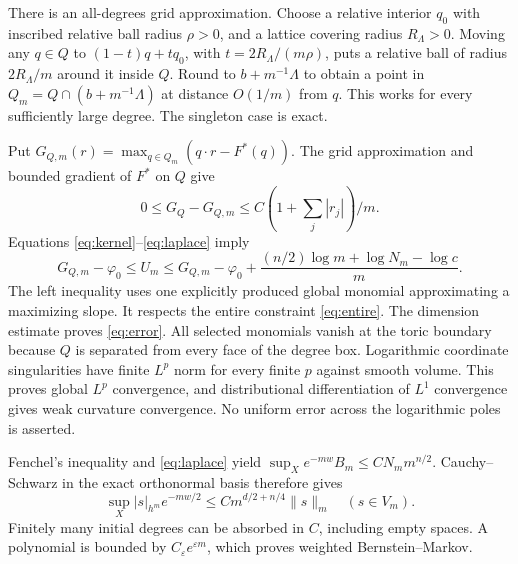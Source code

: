 \documentclass[11pt]{article}
\begin{document}
There is an all-degrees grid approximation. Choose a relative interior
$q_0$ with inscribed relative ball radius $\rho>0$, and a lattice
covering radius $R_\Lambda>0$. Moving any $q\in Q$ to
$(1-t)q+tq_0$, with $t=2R_\Lambda/(m\rho)$, puts a relative ball
of radius $2R_\Lambda/m$ around it inside $Q$. Round to
$b+m^{-1}\Lambda$ to obtain a point in
$Q_m=Q\cap(b+m^{-1}\Lambda)$ at distance $O(1/m)$ from $q$.
This works for every sufficiently large degree. The singleton case
is exact.

Put $G_{Q,m}(r)=\max_{q\in Q_m}(q\cdot r-F^*(q))$.
The grid approximation and bounded gradient of $F^*$ on $Q$ give
\[
 0\leq G_Q-G_{Q,m}\leq C(1+\textstyle\sum_j|r_j|)/m.
\]
Equations \eqref{eq:kernel}--\eqref{eq:laplace} imply
\begin{equation}\label{eq:sandwich}
 G_{Q,m}-\varphi_0\leq U_m\leq G_{Q,m}-\varphi_0+
               \frac{(n/2)\log m+\log N_m-\log c}{m}.
\end{equation}
The left inequality uses one explicitly produced global monomial
approximating a maximizing slope. It respects the entire constraint
\eqref{eq:entire}. The dimension estimate proves \eqref{eq:error}.
All selected monomials vanish at the toric boundary because $Q$ is
separated from every face of the degree box. Logarithmic coordinate
singularities have finite $L^p$ norm for every finite $p$ against
smooth volume. This proves global $L^p$ convergence, and distributional
differentiation of $L^1$ convergence gives weak curvature convergence.
No uniform error across the logarithmic poles is asserted.

Fenchel's inequality and \eqref{eq:laplace} yield
$\sup_X e^{-mw}B_m\leq C N_m m^{n/2}$. Cauchy--Schwarz in the exact
orthonormal basis therefore gives
\[
 \sup_X|s|_{h^m}e^{-mw/2}
             \leq C m^{d/2+n/4}\|s\|_m\quad(s\in V_m).
\]
Finitely many initial degrees can be absorbed in $C$, including empty
spaces. A polynomial is bounded by $C_\varepsilon e^{\varepsilon m}$,
which proves weighted Bernstein--Markov.
\end{document}

